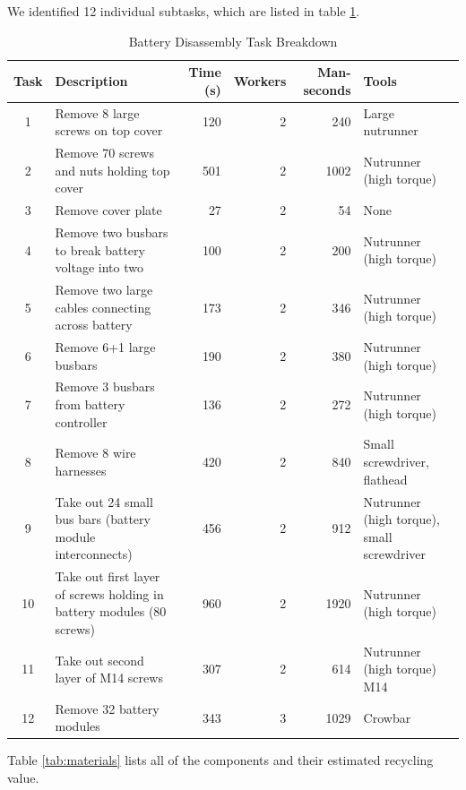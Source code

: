 \documentclass[letterpaper, 10 pt, conference]{ieeeconf}  %
\begin{document}
We identified 12 individual subtasks, which are listed in table \ref{tab:timing}. 
\begin{table}[!htb]
\caption{Battery Disassembly Task Breakdown\label{tab:timing}}
\begin{center}
\begin{tabular}{|c|l|r|r|r|l|}
\hline
Task & Description & Time (s) & Workers & Man-seconds & Tools \\
\hline
1 & Remove 8 large screws on top cover & 120 & 2 & 240 & Large nutrunner \\
2 & Remove 70 screws and nuts holding top cover & 501 & 2 & 1002 & Nutrunner (high torque) \\
3 & Remove cover plate & 27 & 2 & 54 & None \\
4 & Remove two busbars to break battery voltage into two & 100 & 2 & 200 & Nutrunner (high torque) \\
5 & Remove two large cables connecting across battery & 173 & 2 & 346 & Nutrunner (high torque) \\
6 & Remove 6+1 large busbars & 190 & 2 & 380 & Nutrunner (high torque) \\
7 & Remove 3 busbars from battery controller & 136 & 2 & 272 & Nutrunner (high torque) \\
8 & Remove 8 wire harnesses & 420 & 2 & 840 & Small screwdriver, flathead \\
9 & Take out 24 small bus bars (battery module interconnects) & 456 & 2 & 912 & Nutrunner (high torque), small screwdriver \\
10 & Take out first layer of screws holding in battery modules (80 screws) & 960 & 2 & 1920 & Nutrunner (high torque) \\
11 & Take out second layer of M14 screws & 307 & 2 & 614 & Nutrunner (high torque) M14 \\
12 & Remove 32 battery modules & 343 & 3 & 1029 & Crowbar \\
\hline
\end{tabular}
\end{center}
\end{table}

Table \ref{tab:materials} lists all of the components and their estimated recycling value. 
\end{document}
